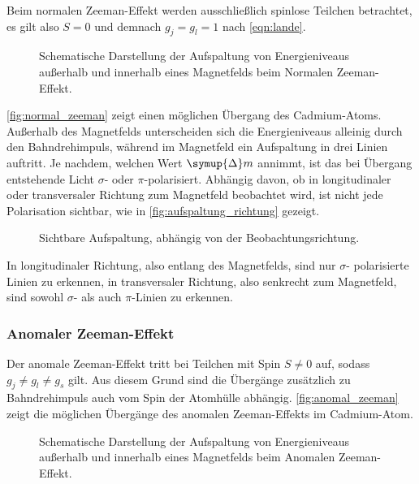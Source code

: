     Beim normalen Zeeman-Effekt werden ausschließlich spinlose Teilchen betrachtet,
    es gilt also $S = 0$ und demnach $g_j = g_l = 1$ nach \autoref{eqn:lande}.
    \begin{figure}[H]
      \centering
        \resizebox{0.5\textwidth}{!}{
            
        }
       \caption{Schematische Darstellung der Aufspaltung von Energieniveaus außerhalb und innerhalb eines Magnetfelds beim Normalen Zeeman-Effekt.}
       \label{fig:normal_zeeman}
    \end{figure}
    \autoref{fig:normal_zeeman} zeigt einen möglichen Übergang des Cadmium-Atoms.
    Außerhalb des Magnetfelds unterscheiden sich die Energieniveaus alleinig durch den Bahndrehimpuls,
    während im Magnetfeld ein Aufspaltung in drei Linien auftritt.
    Je nachdem,
    welchen Wert $\symup{\Delta} m$ annimmt,
    ist das bei Übergang entstehende Licht $\sigma$- oder $\pi$-polarisiert.
    Abhängig davon,
    ob in longitudinaler oder transversaler Richtung zum Magnetfeld beobachtet wird,
    ist nicht jede Polarisation sichtbar,
    wie in \autoref{fig:aufspaltung_richtung} gezeigt.
    \begin{figure}
       \centering
        \resizebox{0.8\textwidth}{!}{
            
        }
       \caption{Sichtbare Aufspaltung, abhängig von der Beobachtungsrichtung. \cite{haken_wolf}}
       \label{fig:aufspaltung_richtung}
    \end{figure}
    In longitudinaler Richtung,
    also entlang des Magnetfelds,
    sind nur $\sigma$- polarisierte Linien zu erkennen,
    in transversaler Richtung,
    also senkrecht zum Magnetfeld,
    sind sowohl $\sigma$- als auch $\pi$-Linien zu erkennen.


\subsubsection{Anomaler Zeeman-Effekt}

    Der anomale Zeeman-Effekt tritt bei Teilchen mit Spin $S \neq 0$ auf,
    sodass $g_j \neq g_l \neq g_s$ gilt.
    Aus diesem Grund sind die Übergänge zusätzlich zu Bahndrehimpuls auch vom Spin der Atomhülle abhängig.
    \autoref{fig:anomal_zeeman} zeigt die möglichen Übergänge des anomalen Zeeman-Effekts im Cadmium-Atom.
    \begin{figure}[H]
      \centering
        \resizebox{0.5\textwidth}{!}{
            
        }
       \caption{Schematische Darstellung der Aufspaltung von Energieniveaus außerhalb und innerhalb eines Magnetfelds beim Anomalen Zeeman-Effekt.}
       \label{fig:anomal_zeeman}
    \end{figure}


